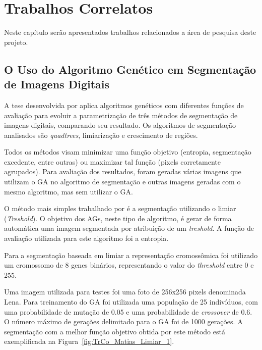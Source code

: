 \documentclass[12pt,oneside,a4paper,english,french,spanish,brazil,]{abntex2}
\begin{document}
\chapter{Trabalhos Correlatos}

Neste capítulo serão apresentados trabalhos relacionados a área de pesquisa deste projeto.


\section{O Uso do Algoritmo Genético em Segmentação de Imagens Digitais}

A tese desenvolvida por \citet{matias:2007} aplica algoritmos genéticos com diferentes funções de avaliação para evoluir a parametrização de três métodos de segmentação de imagens digitais, comparando seu resultado. Os algoritmos de segmentação analisados são \textit{quadtrees}, limiarização e crescimento de regiões.

Todos os métodos visam minimizar uma função objetivo (entropia, segmentação excedente, entre outras) ou maximizar tal função (pixels corretamente agrupados). Para avaliação dos resultados, foram geradas várias imagens que utilizam o GA no algoritmo de segmentação e outras imagens geradas com o mesmo algoritmo, mas sem utilizar o GA. 

O método mais simples trabalhado por \citet{matias:2007} é a segmentação utilizando o limiar (\textit{Treshold}). O objetivo dos AGs, neste tipo de algoritmo, é gerar de forma automática uma imagem segmentada por atribuição de um \textit{treshold}. A função de avaliação utilizada para este algoritmo foi a entropia.

Para a segmentação baseada em limiar a representação cromossômica foi utilizado um cromossomo de 8 genes binários, representando o valor do \textit{threshold} entre 0 e 255. 

Uma imagem utilizada para testes foi uma foto de 256x256 pixels denominada Lena. Para treinamento do GA foi utilizada uma população de 25 indivíduos, com uma probabilidade de mutação de 0.05 e uma probabilidade de \textit{crossover} de 0.6. O número máximo de gerações delimitado para o GA foi de 1000 gerações. A segmentação com a melhor função objetivo obtida por este método está exemplificada na Figura~\ref{fig:TrCo_Matias_Limiar_1}.
\end{document}
